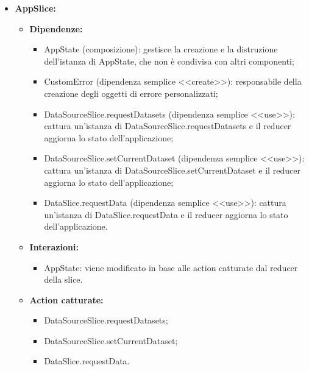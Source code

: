 \begin{itemize}
      \item \textbf{AppSlice:}
            \begin{itemize}
                  \item \textbf{Dipendenze:}
                        \begin{itemize}
                              \item AppState (composizione): gestisce la creazione e la distruzione dell'istanza di
                                    AppState, che non è condivisa con altri componenti;
                              \item CustomError (dipendenza semplice <<create>>): responsabile della creazione
                                    degli oggetti di errore personalizzati;
                              \item DataSourceSlice.requestDatasets (dipendenza semplice <<use>>): cattura
                                    un'istanza di DataSourceSlice.requestDatasets e il reducer aggiorna lo stato
                                    dell'applicazione;
                              \item DataSourceSlice.setCurrentDataset (dipendenza semplice <<use>>): cattura
                                    un'istanza di DataSourceSlice.setCurrentDataset e il reducer aggiorna lo stato
                                    dell'applicazione;
                              \item DataSlice.requestData (dipendenza semplice <<use>>): cattura un'istanza di
                                    DataSlice.requestData e il reducer aggiorna lo stato dell'applicazione.
                        \end{itemize}
                  \item \textbf{Interazioni:}
                        \begin{itemize}
                              \item AppState: viene modificato in base alle action catturate dal reducer della
                                    slice.
                        \end{itemize}
                  \item \textbf{Action catturate:}
                        \begin{itemize}
                              \item DataSourceSlice.requestDatasets;
                              \item DataSourceSlice.setCurrentDataset;
                              \item DataSlice.requestData.
                        \end{itemize}
            \end{itemize}


\end{itemize}

